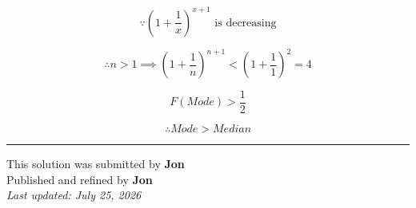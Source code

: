 \documentclass[12pt]{article}
\begin{document}
$$\because \left(1+\frac1x\right)^{x+1}\text{ is decreasing}$$

$$\therefore n>1\implies \left(1+\frac1n\right)^{n+1}<\left(1+\frac11\right)^2=4$$

$$F(Mode)>\frac12$$

$$\therefore Mode>Median$$

\bigskip
\hrule
\begin{center}
    This solution was submitted by \textbf{Jon}\\[4pt]
    Published and refined by \textbf{Jon}\\[8pt]
    \textit{Last updated: July 25, 2026}
\end{center}
\end{document}
